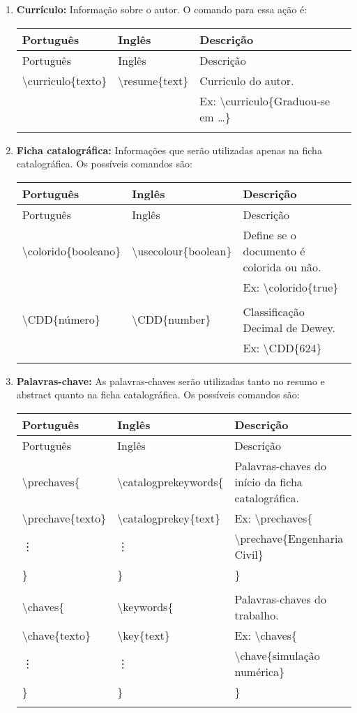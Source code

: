 \documentclass{book}
\newcommand{\bs}{\textbackslash}
\newcommand{\nl}{\\ & &}
\newcommand{\newrow}[4]{
  \bs #1 & \bs #2 & #3 \nl
                    #4 \nl \\
}
\newenvironment{mytable}{
\begin{longtable}{ p{4.8cm} p{4.3cm} p{8cm} }

\hline
  Português      & Inglês     & Descrição  \\
  \hline
\endfirsthead

\hline
  Português      & Inglês     & Descrição  \\
  \hline
\endhead

\hline
\endfoot
}{
\end{longtable}
}
\begin{document}
\begin{enumerate}
  \item \textbf{Currículo:} Informação sobre o autor. O comando para essa ação é:

  \begin{mytable}     
    \newrow{curriculo\{texto\}}{resume\{text\}}
           {Curriculo do autor.}
           {Ex: \bs curriculo\{Graduou-se em \ldots \}}
  \end{mytable}       
           
  \item \textbf{Ficha catalográfica:} Informações que serão utilizadas apenas na ficha catalográfica. Os possíveis comandos são:

  \begin{mytable}    
     \newrow{colorido\{booleano\}}{usecolour\{boolean\}}
           {Define se o documento é colorida ou não.}
           {Ex: \bs colorido\{true\}}
           
    \newrow{CDD\{número\}}{CDD\{number\}}
           {Classificação Decimal de Dewey.}
           {Ex: \bs CDD\{624\}}
  \end{mytable}   

  \item \textbf{Palavras-chave:} As palavras-chaves serão utilizadas tanto no resumo e abstract quanto na ficha catalográfica. Os possíveis comandos são:

  \begin{mytable}  
     \bs prechaves\{                & \bs catalogprekeywords\{ &  Palavras-chaves do início da ficha catalográfica. \\
    \indent \bs prechave\{texto\}  &\indent \bs catalogprekey\{text\} & Ex: \bs prechaves\{ \\
    \indent \vdots     &\indent \vdots  & \hspace{0.5cm} \bs prechave\{Engenharia Civil\} \\
    \}                        & \}    & \} \\
    &&\\
    
    \bs chaves\{                & \bs keywords\{ &  Palavras-chaves do trabalho. \\
    \indent \bs chave\{texto\}  &\indent \bs key\{text\} & Ex: \bs chaves\{ \\
    \indent \vdots     &\indent \vdots  & \hspace{0.5cm} \bs chave\{simulação numérica\} \\
    \}                        & \}    & \} \\
    &&\\
            

\end{mytable}
\end{enumerate}
\end{document}
